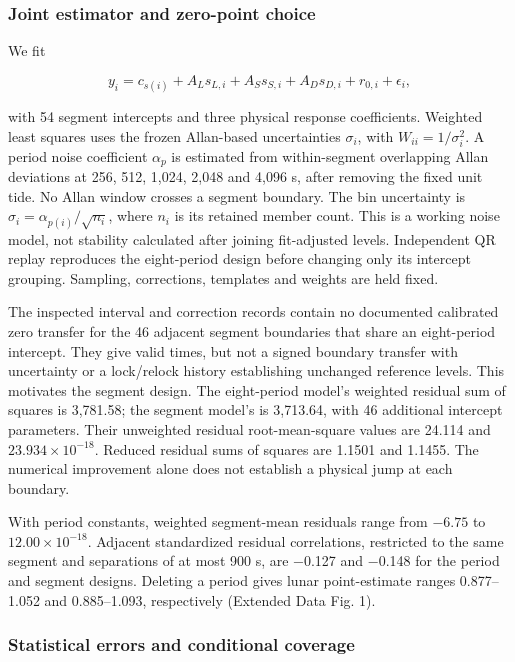 \documentclass[
  10pt,
  a4paper,
]{article}
\begin{document}
\hypertarget{joint-estimator-and-zero-point-choice}{%
\subsubsection{Joint estimator and zero-point
choice}\label{joint-estimator-and-zero-point-choice}}

We fit

\[y_i=c_{s(i)}+A_Ls_{L,i}+A_Ss_{S,i}+A_Ds_{D,i}+r_{0,i}+\epsilon_i,\]

with 54 segment intercepts and three physical response coefficients.
Weighted least squares uses the frozen Allan-based uncertainties
\(\sigma_i\), with \(W_{ii}=1/\sigma_i^2\). A period noise coefficient
\(\alpha_p\) is estimated from within-segment overlapping Allan
deviations at 256, 512, 1,024, 2,048 and 4,096 s, after removing the
fixed unit tide. No Allan window crosses a segment boundary. The bin
uncertainty is \(\sigma_i=\alpha_{p(i)}/\sqrt{n_i}\), where \(n_i\) is
its retained member count. This is a working noise model, not stability
calculated after joining fit-adjusted levels. Independent QR replay
reproduces the eight-period design before changing only its intercept
grouping. Sampling, corrections, templates and weights are held fixed.

The inspected interval and correction records contain no documented
calibrated zero transfer for the 46 adjacent segment boundaries that
share an eight-period intercept. They give valid times, but not a signed
boundary transfer with uncertainty or a lock/relock history establishing
unchanged reference levels. This motivates the segment design. The
eight-period model's weighted residual sum of squares is 3,781.58; the
segment model's is 3,713.64, with 46 additional intercept parameters.
Their unweighted residual root-mean-square values are 24.114 and
\(23.934\times10^{-18}\). Reduced residual sums of squares are 1.1501
and 1.1455. The numerical improvement alone does not establish a
physical jump at each boundary.

With period constants, weighted segment-mean residuals range from
\(-6.75\) to \(12.00\times10^{-18}\). Adjacent standardized residual
correlations, restricted to the same segment and separations of at most
900 s, are −0.127 and −0.148 for the period and segment designs.
Deleting a period gives lunar point-estimate ranges 0.877--1.052 and
0.885--1.093, respectively (Extended Data Fig. 1).

\hypertarget{statistical-errors-and-conditional-coverage}{%
\subsubsection{Statistical errors and conditional
coverage}\label{statistical-errors-and-conditional-coverage}}
\end{document}
